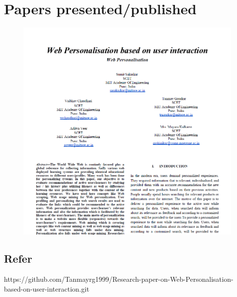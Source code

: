 \newpage
\chapter{Papers presented/published}
\begin{figure}[h!]
    \begin{center}
        \includegraphics[scale=0.65]{paper}
    \end{center}
\end{figure}

\section{Refer}
https://github.com/Tanmayrg1999/Research-paper-on-Web-Personalisation-based-on-user-interaction.git